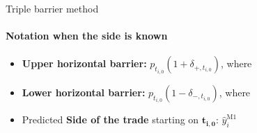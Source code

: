 \documentclass{beamer} %
\begin{document}
\begin{frame}{Triple barrier method}
\framesubtitle{Notation when the side is known}
\begin{itemize}
	\item \textbf{Upper horizontal barrier:} $p_{t_{i,0}} (1 + 
	\delta_{+, t_{i,0}})$, where\\
	
	\vspace{.2cm}
	\vspace{.2cm}
	
	\item \textbf{Lower horizontal barrier:} $p_{t_{i,0}} (1 - 
	\delta_{-, t_{i,0}})$, where\\
	
	\vspace{.2cm}
    \vspace{.2cm}
	
	\item Predicted \textbf{Side of the trade} starting on 
	$\boldsymbol{t_{i,0}}$: $\widehat{y}_i^{\text{M1}}$
\end{itemize}

\end{frame}
\end{document}
